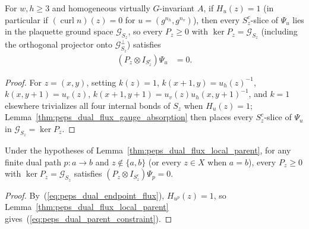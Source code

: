 \begin{lemma}%
    \label{thm:peps_dual_flux_local_parent}
    \leanok
    For $w,h\ge3$ and homogeneous virtually $G$-invariant $A$, if $H_u(z)=1$ (in
    particular if $(\operatorname{curl}n)(z)=0$ for $u=(g^{n_h},g^{n_v})$),
    then every $S_z^c$-slice of $\Psi_u$ lies in the plaquette ground space
    $\mathcal G_{S_z}$, so every $P_z\ge0$ with $\ker P_z=\mathcal G_{S_z}$
    (including the orthogonal projector onto $\mathcal G_{S_z}^\perp$) satisfies
    \begin{align}
        (P_z\otimes I_{S_z^c})\Psi_u & =0.
        \label{eq:peps_dual_parent_constraint}
    \end{align}
\end{lemma}
\begin{proof}\leanok
    For $z=(x,y)$, setting $k(z)=1$, $k(x+1,y)=u_h(z)^{-1}$,
    $k(x,y+1)=u_v(z)$, $k(x+1,y+1)=u_v(z)u_h(x,y+1)^{-1}$, and $k=1$ elsewhere
    trivializes all four internal bonds of $S_z$ when $H_u(z)=1$;
    Lemma~\ref{thm:peps_dual_flux_gauge_absorption} then places every
    $S_z^c$-slice of $\Psi_u$ in $\mathcal G_{S_z}=\ker P_z$.
\end{proof}

\begin{lemma}%
    \label{thm:peps_dual_flux_endpoint_parent}
    \leanok
    Under the hypotheses of Lemma~\ref{thm:peps_dual_flux_local_parent}, for
    any finite dual path $p:a\to b$ and $z\notin\{a,b\}$ (or every $z\in X$
    when $a=b$), every $P_z\ge0$ with $\ker P_z=\mathcal G_{S_z}$ satisfies
    $(P_z\otimes I_{S_z^c})\Psi_p=0$.
\end{lemma}
\begin{proof}\leanok
    By~(\ref{eq:peps_dual_endpoint_flux}), $H_{u^p}(z)=1$, so
    Lemma~\ref{thm:peps_dual_flux_local_parent} gives~(\ref{eq:peps_dual_parent_constraint}).
\end{proof}





